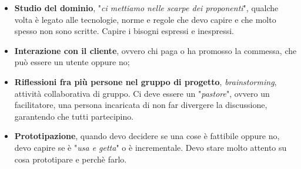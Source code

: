 \begin{itemize}

	\item \textbf{Studio del dominio}, "\textit{ci mettiamo nelle scarpe dei proponenti}", qualche volta è legato alle tecnologie, norme e regole che devo capire e che molto spesso non sono scritte. Capire i bisogni espressi e inespressi.
	\item \textbf{Interazione con il cliente}, ovvero chi paga o ha promosso la commessa, che può essere un utente oppure no;
	\item \textbf{Riflessioni fra più persone nel gruppo di progetto}, \textit{brainstorming}, attività collaborativa di gruppo. Ci deve essere un "\textit{pastore}", ovvero un facilitatore, una persona incaricata di non far divergere la discussione, garantendo che tutti partecipino.
	\item \textbf{Prototipazione}, quando devo decidere se una cose è fattibile oppure no, devo capire se è "\textit{usa e getta}" o è incrementale. Devo stare molto attento su cosa prototipare e perchè farlo.

\end{itemize}

